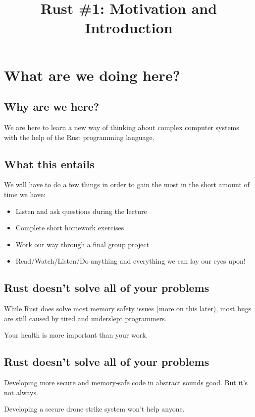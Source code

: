 \documentclass[usenames,twocolumn,dvipsnames,10pt,a4wide]{article}
\title{Rust \#1: Motivation and Introduction}
\begin{document}
\maketitle


\section{What are we doing here?}

\subsection{Why are we here?}
We are here to learn a new way 
of thinking about complex computer 
systems with the help of the Rust 
programming language.


\subsection{What this entails}
We will have to do a few things in order to gain
the most in the short amount of time we have:

\begin{itemize}[label=$\bullet$]
	\item Listen and ask questions during the lecture
	\item Complete short homework exercises
	\item Work our way through a final group project
	\item Read/Watch/Listen/Do anything and everything 
		we can lay our eyes upon!
\end{itemize}


\subsection{Rust doesn't solve all of your problems}
While Rust does solve most memory safety issues
(more on this later), most bugs are still caused
by tired and underslept programmers.

Your health is more important than your work.


\subsection{Rust doesn't solve all of your problems}
Developing more secure and memory-safe code in
abstract sounds good. But it's not always.


Developing a secure drone strike system won't help anyone.
\end{document}
